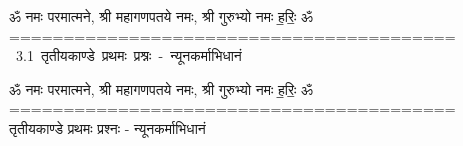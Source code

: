 \documentclass[17pt]{extarticle}
\begin{document}
\begin{titlepage}
    \begin{center}
 
\begin{sanskrit}
    { \Large
    ॐ नमः परमात्मने, श्री महागणपतये नमः, श्री गुरुभ्यो नमः
ह॒रिः॒ ॐ
========================================= 
    }
    \\
    \vspace{2.5cm}
    \mbox{ \Huge
    3.1     तृतीयकाण्डे प्रथमः प्रश्नः - न्यूनकर्माभिधानं   }
\end{sanskrit}
\end{center}

\end{titlepage}
\tableofcontents

ॐ नमः परमात्मने, श्री महागणपतये नमः, श्री गुरुभ्यो नमः
ह॒रिः॒ ॐ
=========================================      तृतीयकाण्डे प्रथमः प्रश्नः - न्यूनकर्माभिधानं \newline

\end{document}
